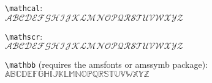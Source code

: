 \documentclass[12pt]{article}
\newcommand{\upperalphabet}{ABCDEFGHIJKLMNOPQRSTUVWXYZ}
\begin{document}
\texttt{\textbackslash mathcal}:\\
$\mathcal{\upperalphabet}$

\texttt{\textbackslash mathscr}:\\
$\mathscr{\upperalphabet}$

\texttt{\textbackslash mathbb} (requires the amsfonts or amssymb package):\\
$\mathbb{\upperalphabet}$
\end{document}

